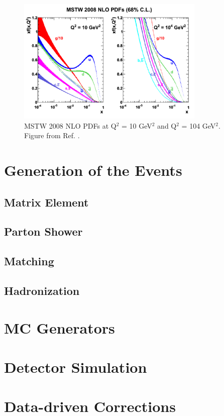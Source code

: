 \begin{figure}[h]
\begin{center}
    \includegraphics[width=0.8\textwidth]{figures/simul/pdf}
\end{center}
 \caption{MSTW 2008 NLO PDFs at Q$^2$ = 10 GeV$^2$ and Q$^2$ = 104 GeV$^2$. Figure from Ref. \cite{Martin:2009iq}.}
  \label{fig:sim:pp}
\end{figure}


\section{Generation of the Events}

\subsection{Matrix Element}

\subsection{Parton Shower}

\subsection{Matching}

\subsection{Hadronization}

\section{MC Generators}

\section{Detector Simulation}

\section{Data-driven Corrections}
